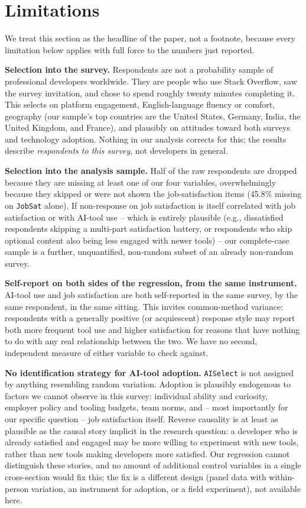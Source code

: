 \documentclass[11pt]{article}
\begin{document}
\section{Limitations}
\label{sec:limitations}

We treat this section as the headline of the paper, not a footnote, because
every limitation below applies with full force to the numbers just
reported.

\textbf{Selection into the survey.} Respondents are not a probability
sample of professional developers worldwide. They are people who use Stack
Overflow, saw the survey invitation, and chose to spend roughly twenty
minutes completing it. This selects on platform engagement, English-language
fluency or comfort, geography (our sample's top countries are the United
States, Germany, India, the United Kingdom, and France), and plausibly on
attitudes toward both surveys and technology adoption. Nothing in our
analysis corrects for this; the results describe \emph{respondents to this
survey}, not developers in general.

\textbf{Selection into the analysis sample.} Half of the raw respondents
are dropped because they are missing at least one of our four variables,
overwhelmingly because they skipped or were not shown the job-satisfaction
items (45.8\% missing on \texttt{JobSat} alone). If non-response on job
satisfaction is itself correlated with job satisfaction or with AI-tool
use -- which is entirely plausible (e.g., dissatisfied respondents skipping
a multi-part satisfaction battery, or respondents who skip optional content
also being less engaged with newer tools) -- our complete-case sample is a
further, unquantified, non-random subset of an already non-random survey.

\textbf{Self-report on both sides of the regression, from the same
instrument.} AI-tool use and job satisfaction are both self-reported in
the same survey, by the same respondent, in the same sitting. This invites
common-method variance: respondents with a generally positive (or
acquiescent) response style may report both more frequent tool use and
higher satisfaction for reasons that have nothing to do with any real
relationship between the two. We have no second, independent measure of
either variable to check against.

\textbf{No identification strategy for AI-tool adoption.} \texttt{AISelect}
is not assigned by anything resembling random variation. Adoption is
plausibly endogenous to factors we cannot observe in this survey: individual
ability and curiosity, employer policy and tooling budgets, team norms,
and -- most importantly for our specific question -- job satisfaction
itself. Reverse causality is at least as plausible as the causal story
implicit in the research question: a developer who is already satisfied
and engaged may be more willing to experiment with new tools, rather than
new tools making developers more satisfied. Our regression cannot
distinguish these stories, and no amount of additional control variables
in a single cross-section would fix this; the fix is a different design
(panel data with within-person variation, an instrument for adoption, or
a field experiment), not available here.
\end{document}
